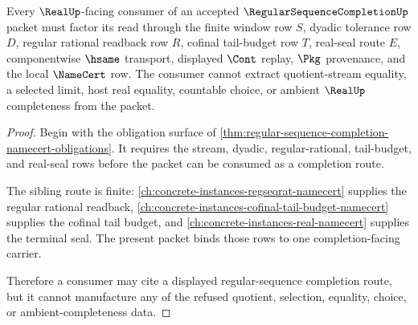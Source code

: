 \begin{theorem}
\label{thm:regular-sequence-completion-real-seal-route}
Every $\RealUp$-facing consumer of an accepted $\RegularSequenceCompletionUp$ packet must factor its read through the finite window row $S$, dyadic tolerance row $D$, regular rational readback row $R$, cofinal tail-budget row $T$, real-seal route $E$, componentwise $\hsame$ transport, displayed $\Cont$ replay, $\Pkg$ provenance, and the local $\NameCert$ row. The consumer cannot extract quotient-stream equality, a selected limit, host real equality, countable choice, or ambient $\RealUp$ completeness from the packet.
\end{theorem}
\begin{proof}
Begin with the obligation surface of \autoref{thm:regular-sequence-completion-namecert-obligations}. It requires the stream, dyadic, regular-rational, tail-budget, and real-seal rows before the packet can be consumed as a completion route.

The sibling route is finite: \autoref{ch:concrete-instances-regseqrat-namecert} supplies the regular rational readback, \autoref{ch:concrete-instances-cofinal-tail-budget-namecert} supplies the cofinal tail budget, and \autoref{ch:concrete-instances-real-namecert} supplies the terminal seal. The present packet binds those rows to one completion-facing carrier.

Therefore a consumer may cite a displayed regular-sequence completion route, but it cannot manufacture any of the refused quotient, selection, equality, choice, or ambient-completeness data.
\end{proof}


\begin{closurestatus}{\RegularSequenceCompletionUp}
  \theoryclosure{\seedClosure}
  \formalstatus{\formalTargetV}
\end{closurestatus}
